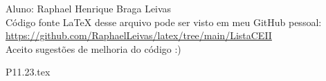 \documentclass[12pt]{scrartcl}
\begin{document}
Aluno: Raphael Henrique Braga Leivas \\[20pt]
Código fonte LaTeX desse arquivo pode ser visto em meu GitHub pessoal: \\[10pt]
\href{https://github.com/RaphaelLeivas/latex/tree/main/ListaCEII}{https://github.com/RaphaelLeivas/latex/tree/main/ListaCEII} \\[20pt]
Aceito sugestões de melhoria do código :) 



{P11.23.tex}
\end{document}
